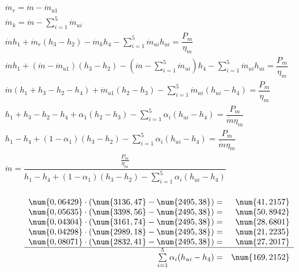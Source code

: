 \begin{math}
	\begin{array}{l}
		\dot m_r = \dot m - \dot m_{u1} \\
		\dot m_k = \dot m - \sum\limits_{i=1}^5 \dot m_{ui} \\
		\dot m h_1 + \dot m_r (h_3 - h_2) - \dot m_k h_4
			- \sum\limits_{i=1}^5 \dot m_{ui} h_{ui} = \dfrac{P_m}{\eta_m} \\
		\dot m h_1 + (\dot m - \dot m_{u1})(h_3 - h_2)
			- (\dot m - \sum\limits_{i=1}^5 \dot m_{ui}) h_4
			- \sum\limits_{i=1}^5 \dot m_{ui} h_{ui} = \dfrac{P_m}{\eta_m} \\
		\dot m (h_1 + h_3 - h_2 - h_4) + \dot m_{u1} (h_2 - h_3)
			- \sum\limits_{i=1}^5 \dot m_{ui} (h_{ui} - h_{4}) = \dfrac{P_m}{\eta_m} \\

		h_1 + h_3 - h_2 - h_4 + \alpha_1 (h_2 - h_3)
			- \sum\limits_{i=1}^5 \alpha_i (h_{ui} - h_{4}) = \dfrac{P_m}{\dot m \eta_m} \\

		h_1 - h_4 + (1 - \alpha_1)(h_3 - h_2)
			- \sum\limits_{i=1}^5 \alpha_i (h_{ui} - h_{4}) = \dfrac{P_m}{\dot m \eta_m} \\

		\dot m = \dfrac{\frac{P_m}{\eta_m}}{
			h_1 - h_4 + (1 - \alpha_1)(h_3 - h_2)
			- \sum\limits_{i=1}^5 \alpha_i (h_{ui} - h_{4})
		} \\
	\end{array}
\end{math}

\renewcommand{\arraystretch}{1}
\begin{math}
	\begin{array}{lrr}
		~~~~~
		& \num{0,06429} \cdot ( \num{3136,47} - \num{2495,38} ) = & \num{41,2157} \\
		& \num{0,05635} \cdot ( \num{3398,56} - \num{2495,38} ) = & \num{50,8942} \\
		& \num{0,04304} \cdot ( \num{3161,74} - \num{2495,38} ) = & \num{28,6801} \\
		& \num{0,04298} \cdot ( \num{2989,18} - \num{2495,38} ) = & \num{21,2235} \\
		& \num{0,08071} \cdot ( \num{2832,41} - \num{2495,38} ) = & \num{27,2017} \\
		\cline{2-3}
		& \sum\limits_{i=1}^5 \alpha_i (h_{ui} - h_{4}) = & \num{169,2152} \\
	\end{array}
\end{math}

